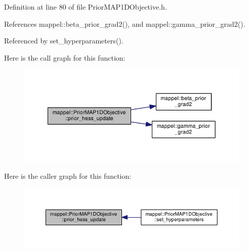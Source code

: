 Definition at line 80 of file Prior\+M\+A\+P1\+D\+Objective.\+h.



References mappel\+::beta\+\_\+prior\+\_\+grad2(), and mappel\+::gamma\+\_\+prior\+\_\+grad2().



Referenced by set\+\_\+hyperparameters().



Here is the call graph for this function\+:\nopagebreak
\begin{figure}[H]
\begin{center}
\leavevmode
\includegraphics[width=350pt]{classmappel_1_1PriorMAP1DObjective_af7dd7f0d9c0ccb34b988e63bd356dcfb_cgraph}
\end{center}
\end{figure}




Here is the caller graph for this function\+:\nopagebreak
\begin{figure}[H]
\begin{center}
\leavevmode
\includegraphics[width=350pt]{classmappel_1_1PriorMAP1DObjective_af7dd7f0d9c0ccb34b988e63bd356dcfb_icgraph}
\end{center}
\end{figure}


